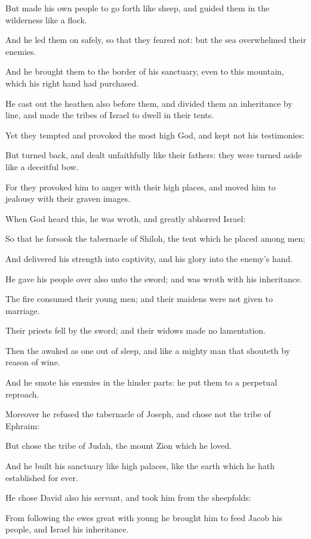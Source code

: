 \verse But made his own people to go forth like sheep, and guided them in the wilderness like a flock.

\verse And he led them on safely, so that they feared not: but the sea overwhelmed their enemies.

\verse And he brought them to the border of his sanctuary, even to this mountain, which his right hand had purchased.

\verse He cast out the heathen also before them, and divided them an inheritance by line, and made the tribes of Israel to dwell in their tents.

\verse Yet they tempted and provoked the most high God, and kept not his testimonies:

\verse But turned back, and dealt unfaithfully like their fathers: they were turned aside like a deceitful bow.

\verse For they provoked him to anger with their high places, and moved him to jealousy with their graven images.

\verse When God heard this, he was wroth, and greatly abhorred Israel:

\verse So that he forsook the tabernacle of Shiloh, the tent which he placed among men;

\verse And delivered his strength into captivity, and his glory into the enemy's hand.

\verse He gave his people over also unto the sword; and was wroth with his inheritance.

\verse The fire consumed their young men; and their maidens were not given to marriage.

\verse Their priests fell by the sword; and their widows made no lamentation.

\verse Then the \LORD awaked as one out of sleep, and like a mighty man that shouteth by reason of wine.

\verse And he smote his enemies in the hinder parts: he put them to a perpetual reproach.

\verse Moreover he refused the tabernacle of Joseph, and chose not the tribe of Ephraim:

\verse But chose the tribe of Judah, the mount Zion which he loved.

\verse And he built his sanctuary like high palaces, like the earth which he hath established for ever.

\verse He chose David also his servant, and took him from the sheepfolds:

\verse From following the ewes great with young he brought him to feed Jacob his people, and Israel his inheritance.

